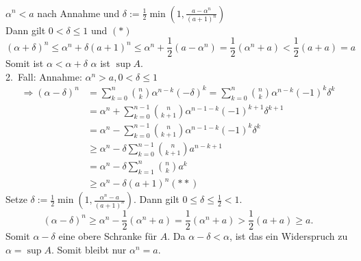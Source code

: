 \documentclass[../ana1.tex]{subfiles}
\begin{document}
\begin{bew}
\begin{align*}
	\end{align*}
	\(\alpha^n <a\) nach Annahme und \(\delta := \frac{1}{2} \min{\left(1, \frac{a-\alpha^n}{{(a+1)}^n}\right)}\) \\
	Dann gilt \(0<\delta\leq 1\) und \((*)\)
	\[ {(\alpha + \delta)}^n \leq \alpha^n + \delta {(a+1)}^n \leq \alpha^n + \frac{1}{2} (a-\alpha^n) = \frac{1}{2} (\alpha^n+a) < \frac{1}{2} (a+a) =a \]
	Somit ist \(\alpha < \alpha + \delta \) \Lightning{} \(\alpha \) ist \(\sup A\).\\
	2.\ Fall: Annahme: \(\alpha^n > a, 0<\delta \leq 1\)
	\begin{align*}
		\Rightarrow {(\alpha - \delta)}^n & = \sum_{k=0}^{n} \binom{n}{k} \alpha^{n-k} {(-\delta)}^k = \sum_{k=0}^{n} \binom{n}{k} \alpha^{n-k} {(-1)}^k\delta^k \\
		                                  & = \alpha^n + \sum_{k=0}^{n-1} \binom{n}{k+1} \alpha^{n-1-k} {(-1)}^{k+1}\delta^{k+1}                                 \\
		                                  & = \alpha^n - \sum_{k=0}^{n-1} \binom{n}{k+1} \alpha^{n-1-k} {(-1)}^{k} \delta^k                                      \\
		                                  & \geq \alpha^n - \delta \sum_{k=0}^{n-1} \binom{n}{k+1} a^{n-k+1}                                                     \\
		                                  & = \alpha^n - \delta \sum_{k=1}^{n} \binom{n}{k} a^k                                                                  \\
		                                  & \geq \alpha^n - \delta {(a+1)}^n (**)
	\end{align*}
	Setze \( \delta := \frac{1}{2} \min \left(1, \frac{\alpha^n-a}{{(a+1)}^n} \right) \). Dann gilt \(0\leq\delta\leq \frac{1}{2}<1\).
	\[ {(\alpha -\delta)}^n \geq \alpha^n - \frac{1}{2} (\alpha^n + a) = \frac{1}{2} (\alpha^n + a) > \frac{1}{2} (a + a) \geq a.\]
	Somit \( \alpha - \delta \) eine obere Schranke für \(A\). Da \(\alpha - \delta<\alpha \), ist das ein Widerspruch zu \(\alpha = \sup A\). Somit bleibt nur \(\alpha^n = a\).
\end{bew}
\end{document}
